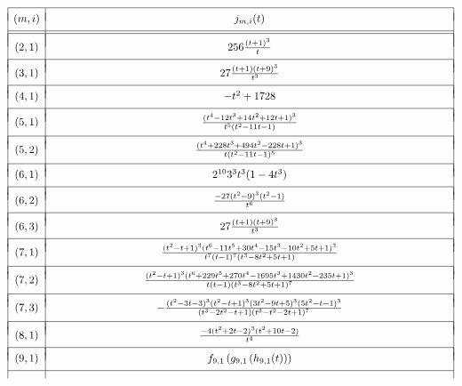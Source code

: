 \begin{table}[!ht]
\[
\begin{array}{|c|c|} 
\hline
 &  \\ [-.75 em]
(m,i) & 
\hphantom{0000000000000000000000000000000000} j_{m,i}(t) \hphantom{0000000000000000000000000000000000}\\
 &  \\ [-.75 em]
\hline
\hline
& \\ [-.75em]
(2,1) & 256\frac{(t+1)^3}{t} \\
& \\ [-.75em]
\hline
& \\ [-.75em]
(3,1) & 27\frac{(t+1)(t+9)^3}{t^3} \\\
& \\ [-.75em]
\hline 
& \\ [-.75em]
(4,1) & -t^2 + 1728 \\
& \\ [-.75em]
\hline 
& \\ [-.75em]
(5,1) & \frac{(t^4 - 12t^3 + 14t^2 + 12t + 1)^3}{t^5(t^2 - 11t - 1)} \\
& \\ [-.75em]
\hline 
& \\ [-.75em]
(5,2) &  \frac{(t^4 + 228t^3 + 494t^2 - 228t + 1)^3}{t(t^2 - 11t - 1)^5} \\
& \\ [-.75em]
\hline 
& \\ [-.75em]
(6,1) &  2^{10}3^3t^3(1-4t^3) \\
& \\ [-.75em]
\hline 
& \\ [-.75em]
(6,2) & \frac{-27(t^2-9)^3(t^2-1)}{t^6} \\
& \\ [-.75em]
\hline 
& \\ [-.75em]
 (6,3) &  27\frac{(t+1)(t+9)^3}{t^3} \\
& \\ [-.75em]
\hline 
& \\ [-.75em]
(7,1) & \frac{(t^2 - t + 1)^3(t^6 - 11t^5 + 30t^4 - 15t^3 - 10t^2 + 5t + 1)^3}{t^7(t-1)^7(t^3 - 8t^2 + 5t + 1)} \\ & \\ [-.75em]
\hline 
& \\ [-.75em]
 (7,2) &  \frac{(t^2 - t + 1)^3(t^6 + 229t^5 + 270t^4 - 1695t^3 + 1430t^2 - 235t + 1)^3}{t(t-1)(t^3 - 8t^2 + 5t + 1)^7}\\
& \\ [-.75em]
\hline 
& \\ [-.75em]
(7,3) &  - \frac{(t^2 - 3t - 3)^3(t^2 - t + 1)^3(3t^2 - 9t + 5)^3(5t^2 - t - 1)^3}{(t^3 - 2t^2 - t + 1)(t^3 - t^2 - 2t + 1)^7} \\
& \\ [-.75em]
\hline 
& \\ [-.75em]
 (8,1) & \frac{-4(t^2+2t-2)^3(t^2+10t-2)}{t^4}\\ 
& \\ [-.75em]
\hline 
& \\ [-.75em]
(9,1) &  f_{9,1} \left( g_{9,1} \left( h_{9,1}(t) \right) \right)\\
& \\ [-.75em]
\hline 
 

\end{array}\]
\end{table}
